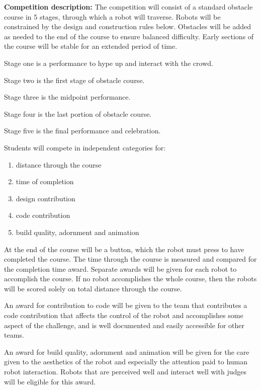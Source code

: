 \documentclass{article}
\begin{document}
\textbf{Competition description:} The competition will consist of a standard obstacle course in 5 stages, through which a robot will traverse. Robots will be constrained by the design and construction rules below. Obstacles will be added as needed to the end of the course to ensure balanced difficulty. Early sections of the course will be stable for an extended period of time. 

Stage one is a performance to hype up and interact with the crowd.

Stage two is the first stage of obstacle course. 

Stage three is the midpoint performance.

Stage four is the last portion of obstacle course. 

Stage five is the final performance and celebration. 

Students will compete in independent categories for:
\begin{enumerate}
	
\item distance through the course
 
\item  time of completion
 
\item  design contribution
 
\item  code contribution
 
 \item build quality, adornment and animation
\end{enumerate}

 At the end of the course will be a button, which the robot must press to have completed the course. The time through the course is measured and compared for the completion time award. Separate awards will be given for each robot to accomplish the course. If no robot accomplishes the whole course, then the robots will be scored solely on total distance through the course. 
 
 An award for contribution to code will be given to the team that contributes a code contribution that affects the control of the robot and accomplishes some aspect of the challenge, and is well documented and easily accessible for other teams. 
 
 An award for build quality, adornment and animation will be given for the care given to the aesthetics of the robot and especially the attention paid to human robot interaction. Robots that are perceived well and interact well with judges will be eligible for this award. 
 
\end{document}
